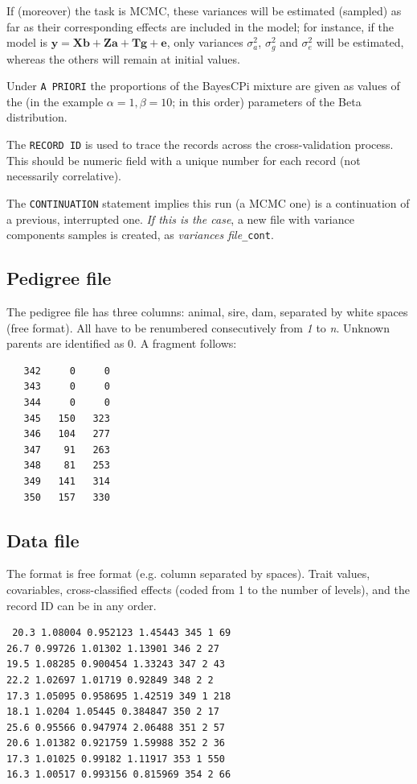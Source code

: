 \documentclass[a4paper,12pt,titlepage]{article}      %
\newcommand{\bsr}{\mathbf} %
\begin{document}
If (moreover) the task is MCMC, these variances will be estimated (sampled) as far as their corresponding effects are included in the model; for instance, if the model is $\bsr{ y = Xb + Za + Tg + e}$, only variances $\sigma^2_a$, $\sigma^2_g$ and $\sigma^2_e$ will be estimated, whereas the others will remain at initial values.

Under \verb|A PRIORI| the proportions of the BayesCPi mixture are given as values of the (in the example $\alpha=1, \beta=10$; in this order) parameters of the Beta distribution. 


The \verb|RECORD ID| is used to trace the records across the cross-validation process. This should be  numeric field with a unique number for each record (not necessarily correlative). 

The \verb|CONTINUATION| statement implies this run (a MCMC one) is a continuation of a previous, interrupted one. \emph{If this is the case}, a new file with variance components samples is created, as \emph{variances file}\verb|_cont|.




\subsection{Pedigree file}
The pedigree file has three columns: animal, sire, dam, separated by white spaces (free format). All have to be renumbered consecutively from \emph{1} to \emph{n}. Unknown parents are identified as 0. A fragment follows:

\begin{verbatim}
   342     0     0
   343     0     0
   344     0     0
   345   150   323
   346   104   277
   347    91   263
   348    81   253
   349   141   314
   350   157   330
\end{verbatim}

\subsection{Data file}
 The format is free format (e.g. column separated by spaces). Trait values, covariables, cross-classified effects (coded from 1 to the number of levels), and the record ID can be in any order. 


{\scriptsize
\begin{verbatim}
 20.3 1.08004 0.952123 1.45443 345 1 69
26.7 0.99726 1.01302 1.13901 346 2 27
19.5 1.08285 0.900454 1.33243 347 2 43
22.2 1.02697 1.01719 0.92849 348 2 2
17.3 1.05095 0.958695 1.42519 349 1 218
18.1 1.0204 1.05445 0.384847 350 2 17
25.6 0.95566 0.947974 2.06488 351 2 57
20.6 1.01382 0.921759 1.59988 352 2 36
17.3 1.01025 0.99182 1.11917 353 1 550
16.3 1.00517 0.993156 0.815969 354 2 66
\end{verbatim}
}
\end{document}
